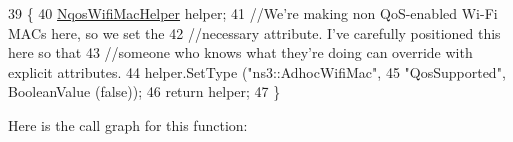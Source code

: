 \begin{DoxyCode}
39 \{
40   \hyperlink{classns3_1_1NqosWifiMacHelper_ac53d0b06ffc7394c0a51f0bc601ecbe4}{NqosWifiMacHelper} helper;
41   \textcolor{comment}{//We're making non QoS-enabled Wi-Fi MACs here, so we set the}
42   \textcolor{comment}{//necessary attribute. I've carefully positioned this here so that}
43   \textcolor{comment}{//someone who knows what they're doing can override with explicit attributes.}
44   helper.SetType (\textcolor{stringliteral}{"ns3::AdhocWifiMac"},
45                   \textcolor{stringliteral}{"QosSupported"}, BooleanValue (\textcolor{keyword}{false}));
46   \textcolor{keywordflow}{return} helper;
47 \}
\end{DoxyCode}


Here is the call graph for this function\+:


